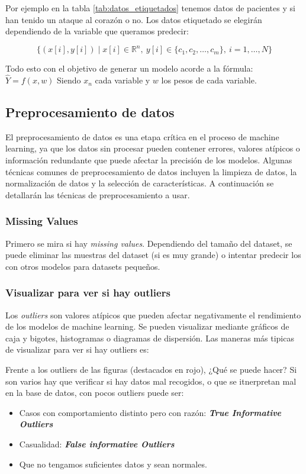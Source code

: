 Por ejemplo en la tabla \ref{tab:datos_etiquetados} tenemos datos de pacientes y si han tenido un ataque al corazón o no. Los datos etiquetado se elegirán dependiendo de la variable que queramos predecir:

\[ \{ (x[i], y[i]) \mid x[i] \in \mathbb{R}^n,\ y[i] \in \{c_1, c_2, \dots, c_m\},\ i = 1, \dots, N \} \]

Todo esto con el objetivo de generar un modelo acorde a la fórmula: $ \hat{Y} = f\left(x, w\right) $ Siendo $x_n$ cada variable y $w$ los pesos de cada variable.

\subsection{Preprocesamiento de datos}

El preprocesamiento de datos es una etapa crítica en el proceso de machine learning, ya que los datos sin procesar pueden contener errores, valores atípicos o información redundante que puede afectar la precisión de los modelos. Algunas técnicas comunes de preprocesamiento de datos incluyen la limpieza de datos, la normalización de datos y la selección de características. A continuación se detallarán las técnicas de preprocesamiento a usar.

\subsubsection{Missing Values}
Primero se mira si hay \textit{missing values}. Dependiendo del tamaño del dataset, se puede eliminar las muestras del dataset (si es muy grande) o intentar predecir los con otros modelos para datasets pequeños.

\subsubsection{Visualizar para ver si hay outliers}
Los \textit{outliers} son  valores atípicos que pueden afectar negativamente el rendimiento de los modelos de machine learning. Se pueden visualizar mediante gráficos de caja y bigotes, histogramas o diagramas de dispersión.
Las maneras más tipicas de visualizar para ver si hay outliers es:



Frente a los outliers de las figuras (destacados en rojo), ¿Qué se puede hacer? Si son varios hay que verificar si hay datos mal recogidos, o que se itnerpretan mal en la base de datos, con pocos outliers puede ser:
\begin{itemize}
    \item Casos con comportamiento distinto pero con razón: \textit{\textbf{True Informative Outliers}}
    \item Casualidad: \textbf{\textit{False informative Outliers}}
    \item Que no tengamos suficientes datos y sean normales.
\end{itemize}

